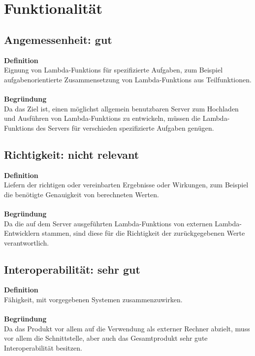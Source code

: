\documentclass[a4paper,20pt,oneside]{book}
\begin{document}
\section{Funktionalität}

\subsection{Angemessenheit: gut}

\textbf{Definition} \\
Eignung von \glspl{Lambda-Funktion} für spezifizierte Aufgaben, zum Beispiel aufgabenorientierte Zusammensetzung von \glspl{Lambda-Funktion} aus Teilfunktionen.  \\ \\
\textbf{Begründung} \\
Da das Ziel ist, einen möglichst allgemein benutzbaren Server zum Hochladen und Ausführen von \glspl{Lambda-Funktion} zu entwickeln, müssen die \glspl{Lambda-Funktion} des Servers für verschieden spezifizierte Aufgaben genügen.

\subsection{Richtigkeit: nicht relevant}

\textbf{Definition} \\
Liefern der richtigen oder vereinbarten Ergebnisse oder Wirkungen, zum Beispiel die benötigte Genauigkeit von berechneten Werten. \\ \\
\textbf{Begründung} \\
Da die auf dem Server ausgeführten \glspl{Lambda-Funktion} von externen \gls{Lambda-Entwickler}n stammen, sind diese für die Richtigkeit der zurückgegebenen Werte verantwortlich.

\subsection{Interoperabilität: sehr gut}

\textbf{Definition} \\
Fähigkeit, mit vorgegebenen Systemen zusammenzuwirken. \\ \\
\textbf{Begründung} \\
Da das Produkt vor allem auf die Verwendung als externer Rechner abzielt, muss vor allem die Schnittstelle, aber auch das Gesamtprodukt sehr gute Interoperabilität besitzen.
\end{document}
